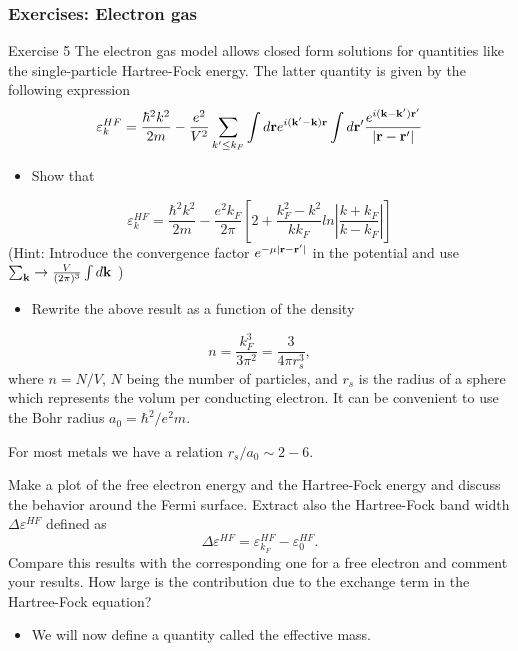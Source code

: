 \documentclass{beamer}
\begin{document}
\begin{frame}
\frametitle{Exercises: Electron gas}

\begin{block}{Exercise 5 }
The electron gas model allows closed form solutions for quantities like the 
single-particle Hartree-Fock energy.  The latter quantity is given by the following expression
\[
\varepsilon_{k}^{HF}=\frac{\hbar^{2}k^{2}}{2m}-\frac{e^{2}}
{V^{2}}\sum_{k'\leq
k_{F}}\int d{\bf r}e^{i({\bf k'}-{\bf k}){\bf r}}\int
d{\bf r}'\frac{e^{i({\bf k}-{\bf k'}){\bf r}'}}
{\vert{\bf r}-{\bf r'}\vert}
\]
\begin{itemize}
 \item Show that
\end{itemize}

\noindent
\[
\varepsilon_{k}^{HF}=\frac{\hbar^{2}k^{2}}{2m}-\frac{e^{2}
k_{F}}{2\pi}
\left[
2+\frac{k_{F}^{2}-k^{2}}{kk_{F}}ln\left\vert\frac{k+k_{F}}
{k-k_{F}}\right\vert
\right]
\]
(Hint: Introduce the convergence factor 
$e^{-\mu\vert{\bf r}-{\bf r}'\vert}$
in the potential and use  $\sum_{{\bf k}}\rightarrow
\frac{V}{(2\pi)^{3}}\int d{\bf k}$ )
\begin{itemize}
 \item Rewrite the above result as a function of the density
\end{itemize}

\noindent
\[
n= \frac{k_F^3}{3\pi^2}=\frac{3}{4\pi r_s^3},
\]
where $n=N/V$, $N$ being the number of particles, and $r_s$ is the radius of a sphere which represents the volum per conducting electron.  
It can be convenient to use the Bohr radius $a_0=\hbar^2/e^2m$.

For most metals we have a relation $r_s/a_0\sim 2-6$.

Make a plot of the free electron energy and the Hartree-Fock energy and discuss the behavior around the Fermi surface. Extract also   the Hartree-Fock band width $\Delta\varepsilon^{HF}$ defined as
\[ 
\Delta\varepsilon^{HF}=\varepsilon_{k_{F}}^{HF}-
\varepsilon_{0}^{HF}.
\]
Compare this results with the corresponding one for a free electron and comment your results. How large is the contribution due to the exchange term in the Hartree-Fock equation?\newline
\begin{itemize}
 \item We will now define a quantity called the effective mass.
\end{itemize}


\end{block}
\end{frame}
\end{document}

